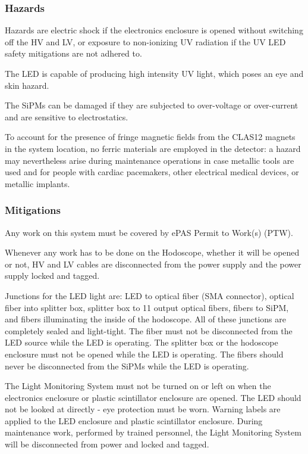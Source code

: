 \subsubsection{Hazards} 

Hazards are electric shock if the electronics enclosure is opened without switching off the 
HV and LV, or exposure to non-ionizing UV radiation if the UV LED safety mitigations are not 
adhered to.

The LED is capable of producing high intensity UV light, which poses an eye and skin hazard. 

The SiPMs can be damaged if they are subjected to over-voltage or over-current and are sensitive 
to electrostatics.

To account for the presence of fringe magnetic fields from the CLAS12 magnets in the system 
location, no ferric materials are employed in the detector: a hazard may nevertheless arise 
during maintenance operations in case metallic tools are used and for people with cardiac 
pacemakers, other electrical medical devices, or metallic implants.

\subsubsection{Mitigations}

Any work on this system must be covered by ePAS Permit to Work(s) (PTW).

Whenever any work has to be done on the Hodoscope, whether it will be opened or not, HV and 
LV cables are disconnected from the power supply and the power supply locked and tagged.

Junctions for the LED light are: LED to optical fiber (SMA connector), optical fiber into 
splitter box, splitter box to 11 output optical fibers, fibers to SiPM, and fibers illuminating 
the inside of the hodoscope. All of these junctions are completely sealed and light-tight. The 
fiber must not be disconnected from the LED source while the LED is operating. The splitter box 
or the hodoscope enclosure must not be opened while the LED is operating. The fibers should 
never be disconnected from the SiPMs while the LED is operating. 

The Light Monitoring System must not be turned on or left on when the electronics enclosure 
or plastic scintillator enclosure are opened. The LED should not be looked at directly - eye 
protection must be worn. Warning labels are applied to the LED enclosure and plastic 
scintillator enclosure.  During maintenance work, performed by trained personnel, the Light 
Monitoring System will be disconnected from power and locked and tagged.

